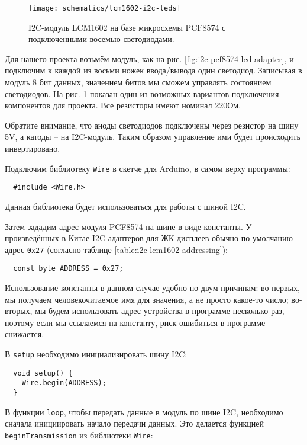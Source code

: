 \documentclass[../sparc.tex]{subfiles}
\begin{document}
\begin{figure}[H]
  \centering
  \texttt{[image: schematics/lcm1602-i2c-leds]}
  \caption{I2C-модуль LCM1602 на базе микросхемы PCF8574 с подключенными восемью
    светодиодами.}
  \label{fig:lcm1602-i2c-leds}
\end{figure}

Для нашего проекта возьмём модуль, как на рис.
\ref{fig:i2c-pcf8574-lcd-adapter}, и подключим к каждой из восьми ножек
ввода/вывода один светодиод.  Записывая в модуль 8 бит данных, значением битов
мы сможем управлять состоянием светодиодов.  На рис. \ref{fig:lcm1602-i2c-leds}
показан один из возможных вариантов подключения компонентов для проекта.  Все
резисторы имеют номинал 220Ом.

Обратите внимание, что аноды светодиодов подключены через резистор на шину 5V, а
катоды -- на I2C-модуль.  Таким образом управление ими будет происходить
инвертировано.

Подключим библиотеку \texttt{Wire} в скетче для Arduino, в самом верху
программы:

\begin{verbatim}
  #include <Wire.h>
\end{verbatim}

Данная библиотека будет использоваться для работы с шиной I2C.

Затем зададим адрес модуля PCF8574 на шине в виде константы.  У произведённых в
Китае I2C-адаптеров для ЖК-дисплеев обычно по-умолчанию адрес \texttt{0x27}
(согласно таблице \ref{table:i2c-lcm1602-addressing}):

\begin{verbatim}
  const byte ADDRESS = 0x27;
\end{verbatim}

Использование константы в данном случае удобно по двум причинам: во-первых, мы
получаем человекочитаемое имя для значения, а не просто какое-то число;
во-вторых, мы будем использовать адрес устройства в программе несколько раз,
поэтому если мы ссылаемся на константу, риск ошибиться в программе снижается.

В \texttt{setup} необходимо инициализировать шину I2C:

\begin{verbatim}
  void setup() {
    Wire.begin(ADDRESS);
  }
\end{verbatim}

В функции \texttt{loop}, чтобы передать данные в модуль по шине I2C, необходимо
сначала инициировать начало передачи данных.  Это делается функцией
\texttt{beginTransmission} из библиотеки \texttt{Wire}:
\end{document}
